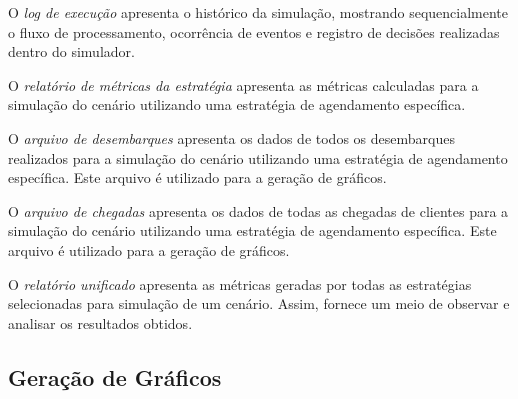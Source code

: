 \begin{description}[leftmargin=!,labelwidth=\widthof{\bfseries Arquivo de Desembarques}]
\item[Log de Execução]
O \textit{log de execução} apresenta o histórico da simulação,
mostrando sequencialmente o fluxo de processamento, ocorrência de eventos e
registro de decisões realizadas dentro do simulador.

\item[Métricas da Estratégia]
O \textit{relatório de métricas da estratégia} apresenta as métricas calculadas
para a simulação do cenário utilizando uma estratégia de agendamento específica.

\item[Arquivo de Desembarques]
O \textit{arquivo de desembarques} apresenta os dados de todos os desembarques
realizados para a simulação do cenário utilizando uma estratégia de agendamento
específica. Este arquivo é utilizado para a geração de gráficos.

\item[Arquivo de Chegadas]
O \textit{arquivo de chegadas} apresenta os dados de todas as chegadas de
clientes para a simulação do cenário utilizando uma estratégia de agendamento
específica. Este arquivo é utilizado para a geração de gráficos.

\item[Relatório Unificado]
O \textit{relatório unificado} apresenta as métricas geradas por todas as
estratégias selecionadas para simulação de um cenário. Assim, fornece um meio de
observar e analisar os resultados obtidos.

\end{description}

\subsection{\label{model:report:charts}Geração de Gráficos}

\lipsum[5]
